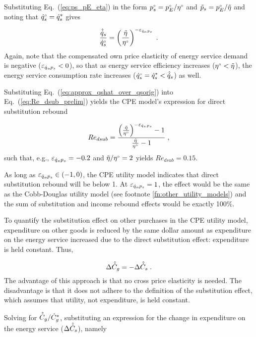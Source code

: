 Substituting Eq.~(\ref{eq:ps_pE_eta}) in the form
${}{p}^{\scriptscriptstyle \circ}_s = {}{p}^{\scriptscriptstyle \circ}_E/{}{\eta}^{\scriptscriptstyle \circ}$ and
$\tilde{p}_s = {}{p}^{\scriptscriptstyle \circ}_E/\tilde{\eta}$
and noting that ${}{\dot{q}}^{\scriptscriptstyle \circ}_s = {\dot{q}}^*_s$ gives

\begin{equation} \label{eq:approx_qshat_over_qsorig}
  \frac{\hat{\dot{q}}_s}{{}{\dot{q}}^{\scriptscriptstyle \circ}_s} = \left( \frac{\tilde{\eta}}{{}{\eta}^{\scriptscriptstyle \circ}} \right)^{-\varepsilon_{\dot{q}_s\!,p_s}} \; .
\end{equation}
%
Again, note that the compensated own price elasticity of energy service demand
is negative ($\varepsilon_{\dot{q}_s\!,p_s} < 0$), so that
as energy service efficiency increases 
(${}{\eta}^{\scriptscriptstyle \circ} < \tilde{\eta}$),
the energy service consumption rate increases 
(${}{\dot{q}}^{\scriptscriptstyle \circ}_s = {\dot{q}}^*_s < \hat{\dot{q}}_s$)
as well.

Substituting Eq.~(\ref{eq:approx_qshat_over_qsorig}) into Eq.~(\ref{eq:Re_dsub_prelim})
yields the CPE model's expression for direct substitution rebound

\begin{equation} \label{eq:Re_dsub_approx}
  Re_{dsub} = \frac{\left( \frac{\tilde{\eta}}{{}{\eta}^{\scriptscriptstyle \circ}} \right)^{-\varepsilon_{\dot{q}_s\!,p_s}} - 1} {\frac{\tilde{\eta}}{{}{\eta}^{\scriptscriptstyle \circ}} - 1} \; ,
\end{equation}
%
such that, e.g.,
$\varepsilon_{\dot{q}_s\!,p_s} = -0.2$ and $\tilde{\eta}/{}{\eta}^{\scriptscriptstyle \circ} = 2$
yields $Re_{dsub} = 0.15$.

As long as $\varepsilon_{\dot{q}_s\!,p_s} \in (-1, 0)$,
the CPE utility model indicates that 
direct substitution rebound will be below 1. 
At $\varepsilon_{\dot{q}_s\!,p_s} = 1$,
the effect would be the same as the Cobb-Douglas utility model 
(see footnote \ref{fn:other_utility_models}) and 
the sum of substitution and income rebound effects 
would be exactly 100\%.

To quantify the substitution effect on other purchases
in the CPE utility model,
expenditure on other goods is reduced
by the same dollar amount 
as expenditure on the energy service increased
due to the direct substitution effect: 
expenditure is held constant. 
Thus,

\begin{equation}
  \Delta \hat{\dot{C}}_g = - \Delta \hat{\dot{C}}_s \; .
\end{equation}
%
The advantage of this approach is that 
no cross price elasticity is needed. 
The disadvantage is that it does not adhere
to the definition of the substitution effect, 
which assumes that utility, not expenditure, is held constant. 

Solving for $\hat{\dot{C}}_g/{\dot{C}}^*_g$,
substituting an expression for
the change in expenditure on the energy service ($\Delta \hat{\dot{C}}_s$), 
namely 

